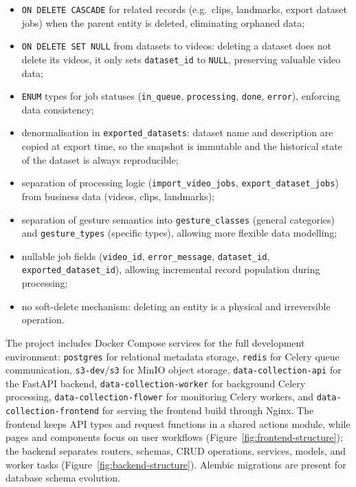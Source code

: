 \begin{itemize}
  \item \texttt{ON DELETE CASCADE} for related records (e.g.\ clips, landmarks,
        export dataset jobs) when the parent entity is deleted, eliminating
        orphaned data;
  \item \texttt{ON DELETE SET NULL} from datasets to videos: deleting a dataset
        does not delete its videos, it only sets \texttt{dataset\_id} to
        \texttt{NULL}, preserving valuable video data;
  \item \texttt{ENUM} types for job statuses (\texttt{in\_queue},
        \texttt{processing}, \texttt{done}, \texttt{error}), enforcing data
        consistency;
  \item denormalisation in \texttt{exported\_datasets}: dataset name and
        description are copied at export time, so the snapshot is immutable and
        the historical state of the dataset is always reproducible;
  \item separation of processing logic (\texttt{import\_video\_jobs},
        \texttt{export\_dataset\_jobs}) from business data (videos, clips,
        landmarks);
  \item separation of gesture semantics into \texttt{gesture\_classes} (general
        categories) and \texttt{gesture\_types} (specific types), allowing more
        flexible data modelling;
  \item nullable job fields (\texttt{video\_id}, \texttt{error\_message},
        \texttt{dataset\_id}, \texttt{exported\_dataset\_id}), allowing
        incremental record population during processing;
  \item no soft-delete mechanism: deleting an entity is a physical and
        irreversible operation.
\end{itemize}

The project includes Docker Compose services for the full development
environment: \texttt{postgres} for relational metadata storage, \texttt{redis}
for Celery queue communication, \texttt{s3-dev}/\texttt{s3} for MinIO object
storage, \texttt{data-collection-api} for the FastAPI backend,
\texttt{data-collection-worker} for background Celery processing,
\texttt{data-collection-flower} for monitoring Celery workers, and
\texttt{data-collection-frontend} for serving the frontend build through Nginx.
The frontend keeps API types and request functions in a shared actions module,
while pages and components focus on user workflows
(Figure~\ref{fig:frontend-structure}); the backend separates routers, schemas,
CRUD operations, services, models, and worker tasks
(Figure~\ref{fig:backend-structure}). Alembic migrations are present for
database schema evolution.

